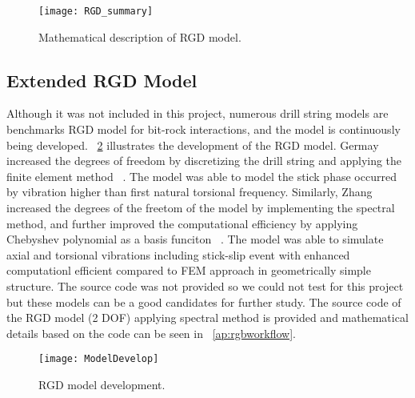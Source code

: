 \begin{figure}[!hbt]
  \centering
  \texttt{[image: RGD\_summary]}
  \caption[Mathematical description of RGD model]{Mathematical description of RGD model.}\label{figure_RGD_Summary}
\end{figure}

\subsection{Extended RGD Model}
Although it was not included in this project, numerous drill string models are benchmarks RGD model for bit-rock interactions, and the model is continuously being developed. \figurename~\ref{model_develop_figure} illustrates the development of the RGD model. Germay increased the degrees of freedom by discretizing the drill string and applying the finite element method ~\cite{ref:germay2009a}. The model was able to model the stick phase occurred by vibration higher than first natural torsional frequency. Similarly, Zhang increased the degrees of the freetom of the model by implementing the spectral method, and further improved the computational efficiency by applying Chebyshev polynomial as a basis funciton ~\cite{ref:zhang2020a}. The model was able to simulate axial and torsional vibrations including stick-slip event with enhanced computationl efficient compared to FEM approach in geometrically simple structure. The source code was not provided so we could not test for this project but these models can be a good candidates for further study. The source code of the RGD model (2 DOF) applying spectral method is provided and mathematical details based on the code can be seen in \appendixname~\ref{ap:rgbworkflow}.

\begin{figure}[ht]
  \centering
  \texttt{[image: ModelDevelop]}
  \caption[RGD model development]{RGD model development.}\label{model_develop_figure}
\end{figure}